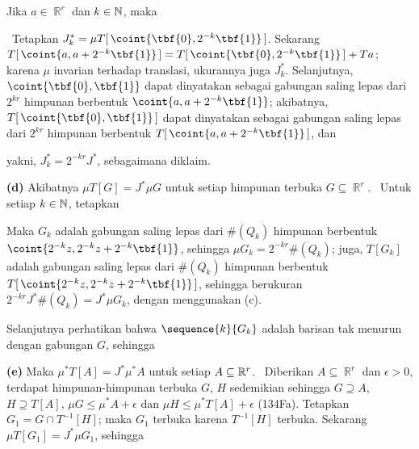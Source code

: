 {Jika $a\in\BbbR^r$ dan $k\in\Bbb N$, maka


\noindent   \Prf\ Tetapkan
$J^*_k=\mu T[\,\coint{\tbf{0},2^{-k}\tbf{1}}\,]$.   Sekarang
$T[\,\coint{a,a+2^{-k}\tbf{1}}\,]
=T[\,\coint{\tbf{0},2^{-k}\tbf{1}}\,]+Ta$;  karena $\mu$
invarian terhadap translasi, ukurannya juga $J^*_k$.   Selanjutnya,
$\coint{\tbf{0},\tbf{1}}$ dapat dinyatakan sebagai gabungan saling lepas dari $2^{kr}$
himpunan berbentuk $\coint{a,a+2^{-k}\tbf{1}}$;  akibatnya,
$T[\,\coint{\tbf{0},\tbf{1}}\,]$ dapat dinyatakan sebagai gabungan saling lepas dari
$2^{kr}$ himpunan berbentuk $T[\,\coint{a,a+2^{-k}\tbf{1}}\,]$, dan



\noindent yakni,
$J^*_k=2^{-kr}J^*$, sebagaimana diklaim.\ \Qed

\medskip

{\bf (d)} Akibatnya $\mu T[G]=J^*\mu G$ untuk setiap himpunan terbuka
$G\subseteq\BbbR^r$.   \Prf\ Untuk setiap $k\in\Bbb N$, tetapkan



\noindent Maka $G_k$ adalah gabungan saling lepas dari $\#(Q_k)$ himpunan berbentuk
$\coint{2^{-k}z,2^{-k}z+2^{-k}\tbf{1}}$, sehingga $\mu G_k=2^{-kr}\#(Q_k)$;
juga, $T[G_k]$ adalah gabungan saling lepas dari $\#(Q_k)$ himpunan berbentuk
$T[\,\coint{2^{-k}z,2^{-k}z+2^{-k}\tbf{1}}\,]$, sehingga berukuran
$2^{-kr}J^*\#(Q_k)=J^*\mu G_k$, dengan menggunakan (c).

Selanjutnya perhatikan bahwa $\sequence{k}{G_k}$ adalah barisan tak menurun dengan
gabungan $G$, sehingga


\medskip

{\bf (e)} Maka $\mu^*T[A]=J^*\mu^* A$ untuk setiap
$A\subseteq\Bbb R^r$.   \Prf\ Diberikan $A\subseteq\BbbR^r$ dan
$\epsilon>0$, terdapat
himpunan-himpunan terbuka $G$, $H$ sedemikian sehingga $G\supseteq A$, $H\supseteq T[A]$,
$\mu G\le\mu^* A+\epsilon$ dan $\mu H\le\mu^*T[A]+\epsilon$ (134Fa).
Tetapkan $G_1=G\cap T^{-1}[H]$;  maka $G_1$ terbuka karena $T^{-1}[H]$
terbuka.   Sekarang $\mu T[G_1]=J^*\mu G_1$, sehingga

}
